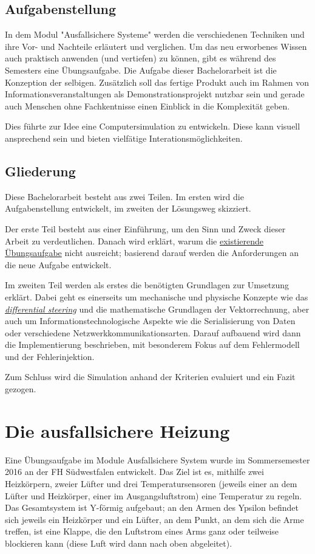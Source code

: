 \subsection{Aufgabenstellung} In dem Modul "Ausfallsichere Systeme" werden die verschiedenen Techniken und ihre Vor- und Nachteile
erl{\"{a}}utert und verglichen. Um das neu erworbenes Wissen auch praktisch anwenden (und vertiefen) zu k{\"{o}}nnen, gibt es w{\"{a}}hrend des Semesters eine {\"{U}}bungsaufgabe.
Die Aufgabe dieser Bachelorarbeit ist die Konzeption der selbigen. Zus{\"{a}}tzlich soll das fertige Produkt auch im Rahmen von Informationsveranstaltungen als Demonstrationsprojekt
nutzbar sein und gerade auch Menschen ohne Fachkentnisse einen Einblick in die Komplexit{\"{a}}t geben.

Dies f{\"{u}}hrte zur Idee eine Computersimulation zu entwickeln. Diese kann visuell ansprechend sein und bieten vielf{\"{a}}tige Interationsm{\"{o}}glichkeiten.

\subsection{Gliederung} Diese Bachelorarbeit besteht aus zwei Teilen. Im ersten wird die Aufgabenstellung entwickelt, im zweiten der L{\"{o}}sungsweg skizziert.

Der erste Teil besteht aus einer Einf{\"{u}}hrung, um den Sinn und Zweck dieser Arbeit zu verdeutlichen. Danach wird erkl{\"{a}}rt, warum die
\hyperref[heizung]{existierende {\"{U}}bungsaufgabe} nicht ausreicht; basierend darauf werden die Anforderungen an die neue Aufgabe entwickelt.

Im zweiten Teil werden als erstes die ben{\"{o}}tigten Grundlagen zur Umsetzung erkl{\"{a}}rt. Dabei geht es einerseits um mechanische und physische Konzepte wie das
\hyperref[diffs]{\textit{differential steering}} und die mathematische Grundlagen der Vektorrechnung, aber auch um Informationstechnologische Aspekte wie die Serialisierung von Daten oder
verschiedene Netzwerkkommunikationsarten. Darauf aufbauend wird dann die Implementierung beschrieben, mit besonderem Fokus auf dem Fehlermodell und der
Fehlerinjektion.

Zum Schluss wird die Simulation anhand der Kriterien evaluiert und ein Fazit gezogen.

\clearpage
\section{Die ausfallsichere Heizung}\label{heizung}
Eine {\"{U}}bungsaufgabe im Module Ausfallsichere System wurde im Sommersemester 2016 an der FH S{\"{u}}dwestfalen entwickelt. Das Ziel ist es, mithilfe zwei Heizk{\"{o}}rpern, zweier
L{\"{u}}fter und drei Temperatursensoren (jeweils einer an dem L{\"{u}}fter und Heizk{\"{o}}rper, einer im Ausgangsluftstrom) eine Temperatur zu regeln.
Das Gesamtsystem ist Y-f{\"{o}}rmig aufgebaut; an den Armen des Ypsilon befindet sich jeweils ein Heizk{\"{o}}rper und ein L{\"{u}}fter, an dem Punkt, an dem sich
die Arme treffen, ist eine Klappe, die den Luftstrom eines Arms ganz oder teilweise blockieren kann (diese Luft wird dann nach oben abgeleitet).

